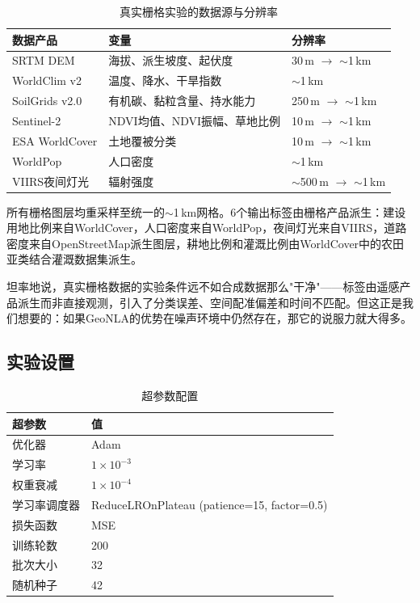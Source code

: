 \documentclass[11pt,a4paper]{article}
\begin{document}
\begin{table}[htbp]
\centering
\caption{真实栅格实验的数据源与分辨率}
\label{tab:real_data}
\renewcommand{\arraystretch}{1.2}
\begin{tabular}{@{}lll@{}}
\toprule
数据产品 & 变量 & 分辨率 \\
\midrule
SRTM DEM & 海拔、派生坡度、起伏度 & 30\,m $\to$ $\sim$1\,km \\
WorldClim v2 & 温度、降水、干旱指数 & $\sim$1\,km \\
SoilGrids v2.0 & 有机碳、黏粒含量、持水能力 & 250\,m $\to$ $\sim$1\,km \\
Sentinel-2 & NDVI均值、NDVI振幅、草地比例 & 10\,m $\to$ $\sim$1\,km \\
ESA WorldCover & 土地覆被分类 & 10\,m $\to$ $\sim$1\,km \\
WorldPop & 人口密度 & $\sim$1\,km \\
VIIRS夜间灯光 & 辐射强度 & $\sim$500\,m $\to$ $\sim$1\,km \\
\bottomrule
\end{tabular}
\end{table}

所有栅格图层均重采样至统一的$\sim$1\,km网格。6个输出标签由栅格产品派生：建设用地比例来自WorldCover，人口密度来自WorldPop，夜间灯光来自VIIRS，道路密度来自OpenStreetMap派生图层，耕地比例和灌溉比例由WorldCover中的农田亚类结合灌溉数据集派生。

坦率地说，真实栅格数据的实验条件远不如合成数据那么"干净"——标签由遥感产品派生而非直接观测，引入了分类误差、空间配准偏差和时间不匹配。但这正是我们想要的：如果GeoNLA的优势在噪声环境中仍然存在，那它的说服力就大得多。

\subsection{实验设置}

\begin{table}[htbp]
\centering
\caption{超参数配置}
\label{tab:hyperparams}
\renewcommand{\arraystretch}{1.2}
\begin{tabular}{@{}ll@{}}
\toprule
超参数 & 值 \\
\midrule
优化器 & Adam \\
学习率 & $1 \times 10^{-3}$ \\
权重衰减 & $1 \times 10^{-4}$ \\
学习率调度器 & ReduceLROnPlateau (patience=15, factor=0.5) \\
损失函数 & MSE \\
训练轮数 & 200 \\
批次大小 & 32 \\
随机种子 & 42 \\
\bottomrule
\end{tabular}
\end{table}
\end{document}
